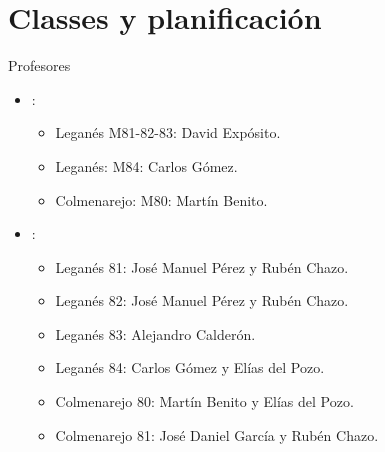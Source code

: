 \section{Classes y planificación}

\begin{frame}[t]{Profesores}
\begin{itemize}
  \item {}: 
    \begin{itemize}
      \item Leganés M81-82-83: David Expósito.
      \item Leganés: M84: Carlos Gómez.
      \item Colmenarejo: M80: Martín Benito.
    \end{itemize}
  \item {}: 
    \begin{itemize}
      \item Leganés 81: José Manuel Pérez y Rubén Chazo.
      \item Leganés 82: José Manuel Pérez y Rubén Chazo.
      \item Leganés 83: Alejandro Calderón.
      \item Leganés 84: Carlos Gómez y Elías del Pozo.
      \item Colmenarejo 80: Martín Benito y Elías del Pozo.
      \item Colmenarejo 81: José Daniel García y Rubén Chazo.
    \end{itemize}
\end{itemize}
\end{frame}

